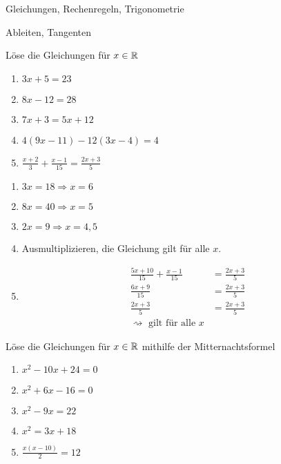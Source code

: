 



\begin{inhalt}
  \item Gleichungen, Rechenregeln, Trigonometrie
  \item Ableiten, Tangenten
\end{inhalt}






 Löse die Gleichungen für $x\in \mathbb{R}$
\begin{multicols}{3}
  \begin{enumerate}
    \item $3x + 5 = 23$
    \item $8x - 12 = 28$
    \item $7x + 3 = 5x + 12$
    \item $4(9x - 11) - 12(3x - 4) = 4$
    \item $\frac{x+2}{3} + \frac{x-1}{15} = \frac{2x+3}{5}$
  \end{enumerate}
\end{multicols}

\begin{lsg}{}
  \begin{multicols}{2}
    \begin{enumerate}
      \item $3x = 18 \Rightarrow x = 6$
      \item $8x = 40 \Rightarrow x = 5$
      \item $2x = 9 \Rightarrow x = 4,5$
      \item Ausmultiplizieren, die Gleichung gilt für alle $x$.
      \item \begin{align*}
        \frac{5x+10}{15} + \frac{x-1}{15} &= \frac{2x+3}{5}\\
        \frac{6x+9}{15} &= \frac{2x+3}{5}\\
        \frac{2x+3}{5} &= \frac{2x+3}{5}\\
        \rightsquigarrow \text{ gilt für alle }x&
      \end{align*}
    \end{enumerate}
  \end{multicols}
\end{lsg}





 Löse die Gleichungen für $x\in \mathbb{R}$ mithilfe der Mitternachtsformel
\begin{multicols}{3}
  \begin{enumerate}
    \item $x^2 - 10x + 24 = 0$
    \item $x^2 + 6x - 16 = 0$
    \item $x^2 - 9x = 22$
    \item $x^2 = 3x + 18$
    \item $\frac{x(x-10)}{2} = 12$
  \end{enumerate}
\end{multicols}


